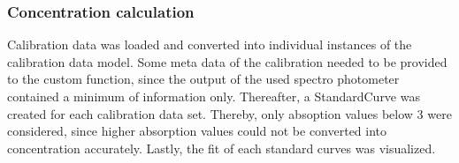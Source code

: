 \documentclass[letterpaper,10pt,english]{jupyterBook}
\begin{document}
\subsubsection{Concentration calculation}
\label{\detokenize{scenarios/SLAC_kinetic_characterization:concentration-calculation}}
\sphinxAtStartPar
Calibration data was loaded and converted into individual instances of the calibration data model. Some meta data of the calibration needed to be provided to the custom  function, since the output of the used spectro photometer contained a minimum of information only. Thereafter, a StandardCurve was created for each calibration data set. Thereby, only absoption values below 3 were considered, since higher absorption values could not be converted into concentration accurately.
Lastly, the fit of each standard curves was visualized.
\end{document}
